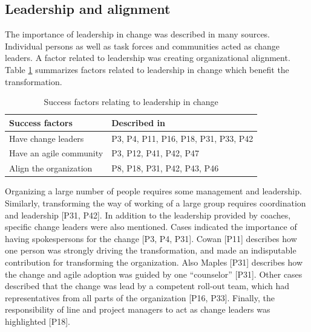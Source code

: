 \subsection{Leadership and alignment}

The importance of leadership in change was described in many sources. Individual
persons as well as task forces and communities acted as change leaders. A factor
related to leadership was creating organizational alignment.
Table \ref{table:success_changeleaders} summarizes factors related to leadership
in change which benefit the transformation.

\begin{table}[h]
    \centering
    \begin{tabular}{ >{\raggedright\arraybackslash}p{}
                     >{\raggedright\arraybackslash}p{} }
        \toprule
        Success factors  &  Described in \\
        \midrule
        Have change leaders  &
                P3, P4, P11, P16, P18, P31, P33, P42  \\
        Have an agile community  &
                P3, P12, P41, P42, P47  \\
        Align the organization  &
                P8, P18, P31, P42, P43, P46  \\
        \bottomrule
    \end{tabular}
    \caption{Success factors relating to leadership in change}
    \label{table:success_changeleaders}
\end{table}


Organizing a large number of people requires some management and leadership.
Similarly, transforming the way of working of a large group requires coordination
and leadership [P31, P42]. In addition to the leadership provided by coaches,
specific change leaders were also mentioned. Cases indicated the importance of
having spokespersons for the change [P3, P4, P31]. Cowan [P11] describes how one
person was strongly driving the transformation, and made an indisputable
contribution for transforming the organization. Also Maples [P31] describes how
the change and agile adoption was guided by one ``counselor'' [P31]. Other cases
described that the change was lead by a competent roll-out team, which had
representatives from all parts of the organization [P16, P33]. Finally, the
responsibility of line and project managers to act as change leaders was
highlighted [P18].

